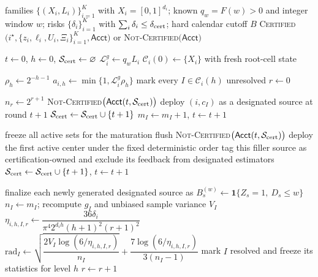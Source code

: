 
\begin{algorithm}[t]
\caption{VS-Certify-Delayed: delayed variance-sensitive family certification}
\label{alg:vs-certify-delayed}
\small
\begin{algorithmic}[1]
\Require families $\{(X_i,L_i)\}_{i=1}^K$ with $X_i=[0,1]^{d_i}$;
known $q_w=F(w)>0$ and integer window $w$;
risks $\{\delta_i\}_{i=1}^K$ with $\sum_i\delta_i\le\delta_{\rm cert}$;
hard calendar cutoff $B$
\Ensure \textsc{Certified}$\bigl(i^\star,\{z_i,\ell_i,U_i,\Xi_i\}_{i=1}^K,\mathsf{Acct}\bigr)$
or \textsc{Not-Certified}$\bigl(\mathsf{Acct}\bigr)$

\State $t\gets0$, $h\gets0$, $\mathcal S_{\rm cert}\gets\varnothing$
    \State $\mathcal L_i^g\gets q_wL_i$
    \State $\mathcal C_i(0)\gets\{X_i\}$ with fresh root-cell state
\EndFor

    \State $\rho_h\gets2^{-h-1}$
        \State $a_{i,h}\gets\min\{1,\mathcal L_i^g\rho_h\}$
        \State mark every $I\in\mathcal C_i(h)$ unresolved
    \EndFor
    \State $r\gets0$

        \State $n_r\gets2^{r+1}$
                    \State \Return \textsc{Not-Certified}$\bigl(\mathsf{Acct}(t,\mathcal S_{\rm cert})\bigr)$
                \EndIf
                \State deploy $(i,c_I)$ as a designated source at round $t+1$
                \State $\mathcal S_{\rm cert}\gets\mathcal S_{\rm cert}\cup\{t+1\}$
                \State $m_I\gets m_I+1$, $t\gets t+1$
            \EndWhile
        \EndFor

        \State freeze all active sets for the maturation flush
                \State \Return \textsc{Not-Certified}$\bigl(\mathsf{Acct}(t,\mathcal S_{\rm cert})\bigr)$
            \EndIf
            \State deploy the first active center under the fixed deterministic order
            \State tag this filler source as certification-owned and exclude its feedback from designated estimators
            \State $\mathcal S_{\rm cert}\gets\mathcal S_{\rm cert}\cup\{t+1\}$, $t\gets t+1$
        \EndFor

        \State finalize each newly generated designated source as
        $B_s^{(w)}\gets\mathbf 1\{Z_s=1,\ D_s\le w\}$
            \State $n_I\gets m_I$; recompute $\widehat g_I$ and unbiased sample variance $V_I$
            \State $\eta_{i,h,I,r}\gets
            \dfrac{36\delta_i}{\pi^4 2^{d_i h}(h+1)^2(r+1)^2}$
            \State $\mathrm{rad}_I\gets
            \sqrt{\dfrac{2V_I\log(6/\eta_{i,h,I,r})}{n_I}}
            +\dfrac{7\log(6/\eta_{i,h,I,r})}{3(n_I-1)}$
                \State mark $I$ resolved and freeze its statistics for level $h$
            \EndIf
        \EndFor
        \State $r\gets r+1$
    \EndWhile


\end{algorithmic}
\end{algorithm}
